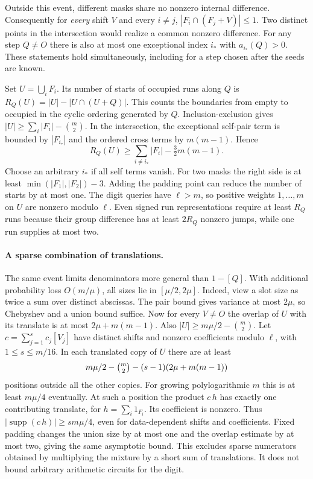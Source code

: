 \documentclass[11pt]{article}
\newcommand{\supp}{\operatorname{supp}}
\begin{document}
Outside this event, different masks share no nonzero internal
difference. Consequently for \emph{every} shift $V$ and every
$i\ne j$, $|F_i\cap(F_j+V)|\le1$. Two distinct points in the
intersection would realize a common nonzero difference. For any
step $Q\ne O$ there is also at most one exceptional index $i_*$ with
$a_{i_*}(Q)>0$. These statements hold simultaneously, including for
a step chosen after the seeds are known.

Set $U=\bigcup_i F_i$. Its number of starts of occupied runs along
$Q$ is $R_Q(U)=|U|-|U\cap(U+Q)|$. This counts the boundaries
from empty to occupied in the cyclic ordering generated by $Q$.
Inclusion-exclusion gives $|U|\ge\sum_i|F_i|-\binom m2$.
In the intersection, the exceptional self-pair term is bounded by
$|F_{i_*}|$ and the ordered cross terms by $m(m-1)$. Hence
\[
     R_Q(U)\ge\sum_{i\ne i_*}|F_i|-\tfrac32m(m-1).            \tag{2}
\]
Choose an arbitrary $i_*$ if all self terms vanish. For two masks the
right side is at least $\min(|F_1|,|F_2|)-3$. Adding the padding
point can reduce the number of starts by at most one. The digit
queries have $\ell>m$, so positive weights $1,\ldots,m$ on $U$
are nonzero modulo $\ell$. Even signed run representations require
at least $R_Q$ runs because their group difference has at least $2R_Q$
nonzero jumps, while one run supplies at most two.

\paragraph{A sparse combination of translations.}
The same event limits denominators more general than $1-[Q]$.
With additional probability loss $O(m/\mu)$, all sizes lie in
$[\mu/2,2\mu]$. Indeed, view a slot size as twice a sum over
distinct abscissas. The pair bound gives variance at most $2\mu$,
so Chebyshev and a union bound suffice. Now for every $V\ne O$
the overlap of $U$ with its translate is at most $2\mu+m(m-1)$.
Also $|U|\ge m\mu/2-\binom m2$. Let
$c=\sum_{j=1}^s c_j[V_j]$ have distinct shifts and nonzero
coefficients modulo $\ell$, with $1\le s\le m/16$.
In each translated copy of $U$ there are at least
\[
 m\mu/2-\tbinom m2-(s-1)(2\mu+m(m-1))
\]
positions outside all the other copies. For growing polylogarithmic
$m$ this is at least $m\mu/4$ eventually. At such a position the product
$c\,h$ has exactly one contributing translate, for
$h=\sum_i 1_{F_i}$. Its coefficient is nonzero. Thus
$|\supp(c\,h)|\ge sm\mu/4$, even for data-dependent shifts and
coefficients. Fixed padding changes the union size by at most one
and the overlap estimate by at most two, giving the same asymptotic
bound. This excludes sparse numerators obtained by multiplying the
mixture by a short sum of translations. It does not bound arbitrary
arithmetic circuits for the digit.
\end{document}
